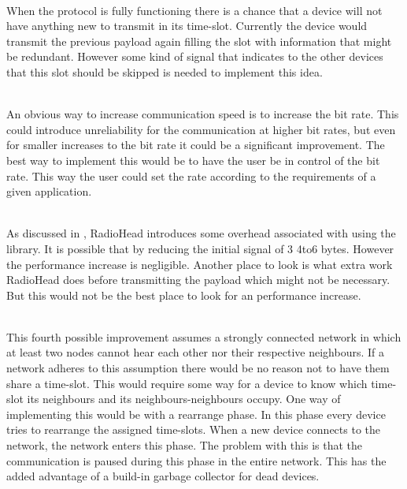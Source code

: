 \begin{description}[labelindent=\parindent]
    \item [Skip unnecessary transmissions]\hfill\\
When the protocol is fully functioning there is a chance that a device will not have anything new to transmit in its time-slot.
Currently the device would transmit the previous payload again filling the slot with information that might be redundant.
However some kind of signal that indicates to the other devices that this slot should be skipped is needed to implement this idea.

    \item[Increase the bit rate]\hfill\\ 
An obvious way to increase communication speed is to increase the bit rate.
This could introduce unreliability for the communication at higher bit rates, but even for smaller increases to the bit rate it could be a significant improvement.
The best way to implement this would be to have the user be in control of the bit rate.
This way the user could set the rate according to the requirements of a given application.

    \item[Reduce overhead]\hfill\\
As discussed in , RadioHead introduces some overhead associated with using the library.
It is possible that by reducing the initial signal of 3 4to6 bytes. 
However the performance increase is negligible.
Another place to look is what extra work RadioHead does before transmitting the payload which might not be necessary.
But this would not be the best place to look for an performance increase.

    \item[Parallelise communication]\hfill\\
This fourth possible improvement assumes a strongly connected network in which at least two nodes cannot hear each other nor their respective neighbours.
If a network adheres to this assumption there would be no reason not to have them share a time-slot.
This would require some way for a device to know which time-slot its neighbours and its neighbours-neighbours occupy.
One way of implementing this would be with a rearrange phase.
In this phase every device tries to rearrange the assigned time-slots.
When a new device connects to the network, the network enters this phase.
The problem with this is that the communication is paused during this phase in the entire network.
This has the added advantage of a build-in garbage collector for dead devices.
\end{description}

